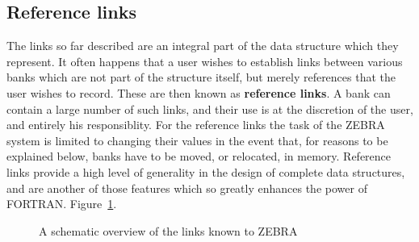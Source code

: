 \subsection{Reference links}
\par The links so far described are an integral part of the data structure
which they represent. It often happens that a user wishes to establish
links between various banks which are not part of the structure itself,
but merely references that the user wishes to record.
These are then known as
{\bf reference links}. A bank can contain a large number of such links,
and their use is at the discretion of the user, and entirely his
responsiblity. For the reference links the task of
the ZEBRA system is limited to changing their
values in the event that, for reasons to be explained
below, banks have to be moved, or relocated, in memory. Reference links
provide a high level of generality in the design of complete data
structures, and are another of those features which so greatly
enhances the power of FORTRAN.
Figure~\ref{ZEBLINK}.
\begin{figure}[h]
\caption{A schematic overview of the links known to ZEBRA}
\label{ZEBLINK}
\end{figure}
